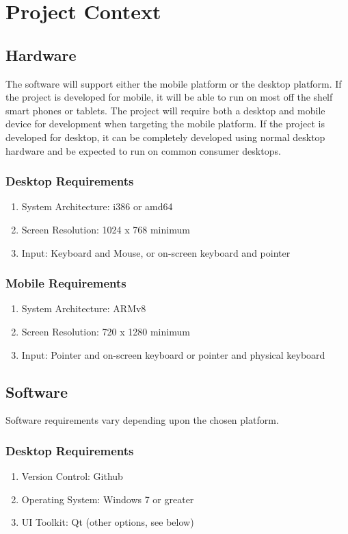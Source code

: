 \documentclass[onecolumn, draftclsnofoot,10pt, compsoc]{IEEEtran}
\begin{document}
\section{Project Context}
\subsection{Hardware}
The software will support either the mobile platform or the desktop platform.
If the project is developed for mobile, it will be able to run on most off the shelf smart phones or tablets.
The project will require both a desktop and mobile device for development when targeting the mobile platform.
If the project is developed for desktop, it can be completely developed using normal desktop hardware and be expected to run on common consumer desktops.
\subsubsection{Desktop Requirements}
\begin{enumerate}
    \item System Architecture: i386 or amd64
    \item Screen Resolution: 1024 x 768 minimum
    \item Input: Keyboard and Mouse, or on-screen keyboard and pointer
\end{enumerate}
\subsubsection{Mobile Requirements}
\begin{enumerate}
    \item System Architecture: ARMv8
    \item Screen Resolution: 720 x 1280 minimum
    \item Input: Pointer and on-screen keyboard or pointer and physical keyboard
\end{enumerate}
\subsection{Software}
Software requirements vary depending upon the chosen platform.
\subsubsection{Desktop Requirements}
\begin{enumerate}
    \item Version Control: Github
    \item Operating System: Windows 7 or greater
    \item UI Toolkit: Qt (other options, see below)
\end{enumerate}
\end{document}
